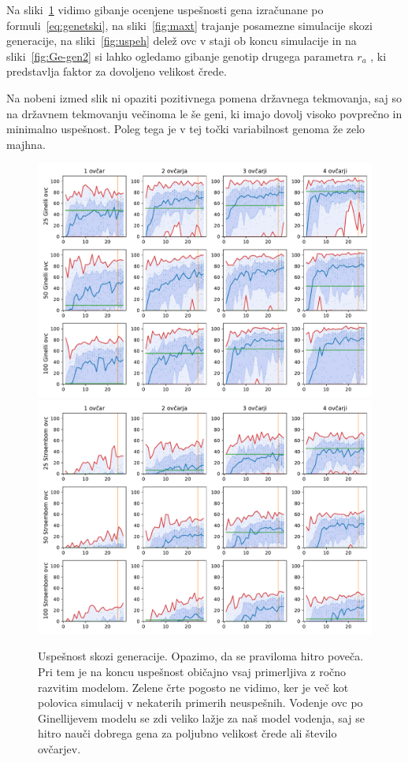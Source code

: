 Na sliki~\ref{fig:fit} vidimo gibanje ocenjene uspešnosti gena izračunane po formuli~\eqref{eq:genetski}, na sliki~\ref{fig:maxt} trajanje posamezne simulacije skozi generacije, na sliki~\ref{fig:uspeh} delež ovc v staji ob koncu simulacije in na sliki~\ref{fig:Ge-gen2} si lahko ogledamo gibanje genotip drugega parametra $r_a$ , ki predstavlja faktor za dovoljeno velikost črede.

Na nobeni izmed slik ni opaziti pozitivnega pomena državnega tekmovanja, saj so na državnem tekmovanju večinoma le še geni, ki imajo dovolj visoko povprečno in minimalno uspešnost. Poleg tega je v tej točki variabilnost genoma že zelo majhna.

\begin{figure}[H]  %
	\centering
	\includegraphics[height=0.4\textheight]{../poglavja/grafi/Ginelli-evolucija-Fitness.pdf}
	\includegraphics[height=0.4\textheight]{../poglavja/grafi/Stroembom-evolucija-Fitness.pdf}
	\caption[Uspešnost skozi generacije]{Uspešnost skozi generacije. Opazimo, da se praviloma hitro poveča. Pri tem je na koncu uspešnost običajno vsaj primerljiva z ročno razvitim modelom. Zelene črte pogosto ne vidimo, ker je več kot polovica simulacij v nekaterih primerih neuspešnih. Vodenje ovc po Ginellijevem modelu se zdi veliko lažje za naš model vodenja, saj se hitro nauči dobrega gena za poljubno velikost črede ali število ovčarjev.} %
	\label{fig:fit}
\end{figure}

